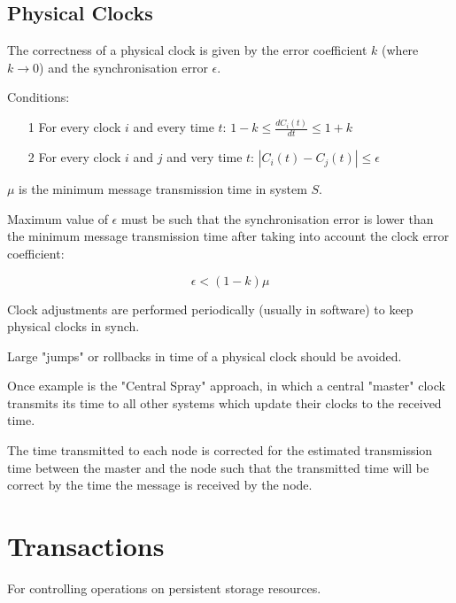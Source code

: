 \documentclass[a4paper]{article}
\begin{document}
\subsection{Physical Clocks}

The correctness of a physical clock is given by the error coefficient $k$ (where
$k \rightarrow 0$) and the synchronisation error $\epsilon$.

Conditions:

\begin{enumerate}
  \item[1] For every clock $i$ and every time $t$: $1-k \leq
           \frac{dC_{i}(t)}{dt} \leq 1 + k$
  \item[2] For every clock $i$ and $j$ and very time $t$: $|C_{i}(t) - C_{j}(t)|
           \leq \epsilon$
\end{enumerate}

$\mu$ is the minimum message transmission time in system $S$.

Maximum value of $\epsilon$ must be such that the synchronisation error is lower
than the minimum message transmission time after taking into account the clock
error coefficient:

\[
  \epsilon < (1-k)\mu
\]

Clock adjustments are performed periodically (usually in software) to keep
physical clocks in synch.

Large "jumps" or rollbacks in time of a physical clock should be avoided.

Once example is the "Central Spray" approach, in which a central "master" clock
transmits its time to all other systems which update their clocks to the
received time.

The time transmitted to each node is corrected for the estimated transmission
time between the master and the node such that the transmitted time will be
correct by the time the message is received by the node.

\section{Transactions}
\label{sec:transactions}

For controlling operations on persistent storage resources.

\end{document}
